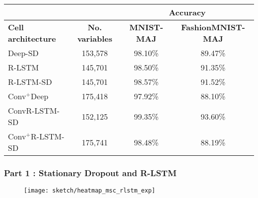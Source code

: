 \renewcommand{\arraystretch}{1.5}
\begin{table}[h]
\begin{center}
\label{tab:maj_exp3_model_acc}
\begin{tabular}{lc|c|c|}
\cline{3-4}
& &
\multicolumn{2}{c|}{\parbox{3.5cm}{ \vskip 1mm \centering \textbf{Accuracy} \vskip 1mm}} \\ \hline
\multicolumn{1}{|l|}{\textbf{Cell architecture}} & \textbf{No. variables} & \textbf{MNIST-MAJ} & \textbf{FashionMNIST-MAJ} \\ \hline
\multicolumn{1}{|l|}{Deep-SD}                  & 153,578             & 98.10\% & 89.47\% \\ 
\multicolumn{1}{|l|}{R-LSTM}                    & 145,701   & 98.50\% & 91.35\% \\ 
\multicolumn{1}{|l|}{R-LSTM-SD}              &  145,701                & 98.57\% & 91.52\% \\ 
 \multicolumn{1}{|l|}{Conv$^+$Deep}       & 175,418                 & 97.92\% & 88.10\% \\
 \multicolumn{1}{|l|}{ConvR-LSTM-SD}      & 152,125                 & 99.35\% & 93.60\%  \\ 
\multicolumn{1}{|l|}{Conv$^+$R-LSTM-SD}   & 175,741                & 98.48\% & 88.19\%  \\ \hline 
\end{tabular}

\end{center}

\end{table}
\renewcommand{\arraystretch}{1}


\subsubsection{Part 1 : Stationary Dropout and R-LSTM}
 \begin{figure}[!htb]
\centering
\texttt{[image: sketch/heatmap\_msc\_rlstm\_exp]}
\label{fig:heatmap_msc_rlstm_exp}
\end{figure}


